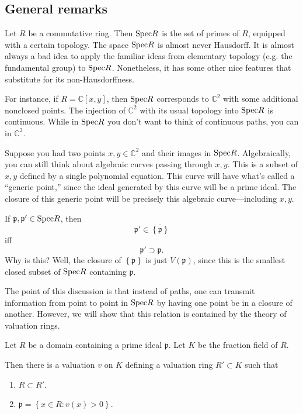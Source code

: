 \subsection{General remarks}
Let $R$ be a commutative ring. Then $\mathrm{Spec} R$ is the set of primes of $R$, equipped
with a certain topology. The space $\mathrm{Spec} R$ is almost never Hausdorff. It is
almost always a bad idea to apply the familiar ideas from elementary topology
(e.g. the fundamental group) to $\mathrm{Spec} R$. Nonetheless, it has some other nice
features that substitute for its non-Hausdorffness.

For instance, if $R = \mathbb{C}[x,y]$, then $\mathrm{Spec} R$ corresponds to
$\mathbb{C}^2$ with some additional nonclosed points.  The injection of
$\mathbb{C}^2$ with its usual topology into $\mathrm{Spec} R$ is continuous. While in
$\mathrm{Spec} R$ you don't want to think of continuous paths, you can in
$\mathbb{C}^2$.

Suppose you had two points $x,y \in \mathbb{C}^2$ and their images in $\mathrm{Spec}
R$.  Algebraically, you can still think about algebraic curves passing through $x,y$.
This is a subset of $x,y$ defined by a single polynomial equation. 
This curve will have what's called a ``generic point,'' since the ideal
generated by this curve will be a prime ideal.
The closure of this generic point will be precisely this algebraic
curve---including $x,y$. 

\begin{remark} 
If $ \mathfrak{p}, \mathfrak{p}' \in \mathrm{Spec} R$, then 
\[ \mathfrak{p}' \in \overline{\left\{\mathfrak{p}\right\}}  \]
iff 
\[ \mathfrak{p}' \supset \mathfrak{p}.  \]
Why is this? Well, the closure of $\left\{\mathfrak{p}\right\}$ is just
$V(\mathfrak{p})$, since this is the smallest closed subset of $\mathrm{Spec} R$
containing $\mathfrak{p}$.  
\end{remark} 

The point of this discussion is that instead of paths, one can transmit
information from point to point in $\mathrm{Spec} R$ by having one point be in a
closure of another.
However, we will show that this relation is contained by the theory of
valuation rings.

\begin{theorem} 
Let $R$ be a domain containing a prime ideal $\mathfrak{p}$.  Let $K$ be the
fraction field of $R$.

Then there is a valuation  $v$ on $K$ defining a valuation ring $R' \subset
K$  such that
\begin{enumerate}
\item $R \subset R'$. 
\item $\mathfrak{p} = \left\{x \in R: v(x) > 0\right\}$.
\end{enumerate}

\end{theorem} 

